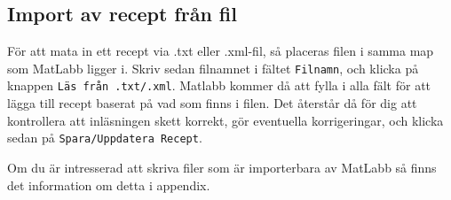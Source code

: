 \subsection{Import av recept från fil}
För att mata in ett recept via .txt eller .xml-fil, så placeras filen i samma map som MatLabb ligger i. Skriv sedan filnamnet i fältet \verb+Filnamn+, och klicka på knappen \verb+Läs från .txt/.xml+. Matlabb kommer då att fylla i alla fält för att lägga till recept baserat på vad som finns i filen. Det återstår då för dig att kontrollera att inläsningen skett korrekt, gör eventuella korrigeringar, och klicka sedan på \verb+Spara/Uppdatera Recept+.

Om du är intresserad att skriva filer som är importerbara av MatLabb så finns det information om detta i appendix.
